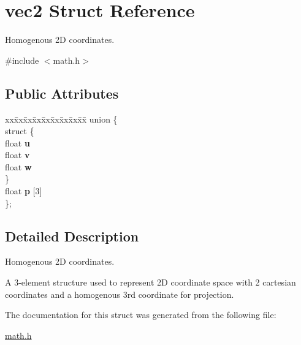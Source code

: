 \hypertarget{structvec2}{}\section{vec2 Struct Reference}
\label{structvec2}


Homogenous 2D coordinates.  




{\ttfamily \#include $<$math.\+h$>$}

\subsection*{Public Attributes}
\begin{DoxyCompactItemize}
\item 
\mbox{\label{structvec2_adb6dab2d0bc861737c54dc7afa57225b}} 
\begin{tabbing}
xx\=xx\=xx\=xx\=xx\=xx\=xx\=xx\=xx\=\kill
union \{\\
\mbox{\label{unionvec2_1_1_0D0_aa6aeded6e4cc7a622b1049d41ca7c263}} 
\>struct \{\\
\>\>float {\bfseries u}\\
\>\>float {\bfseries v}\\
\>\>float {\bfseries w}\\
\>\} \\
\>float {\bfseries p} \mbox{[}3\mbox{]}\\
\}; \\

\end{tabbing}\end{DoxyCompactItemize}


\subsection{Detailed Description}
Homogenous 2D coordinates. 

A 3-\/element structure used to represent 2D coordinate space with 2 cartesian coordinates and a homogenous 3rd coordinate for projection. 

The documentation for this struct was generated from the following file\+:\begin{DoxyCompactItemize}
\item 
\hyperlink{math_8h}{math.\+h}\end{DoxyCompactItemize}
